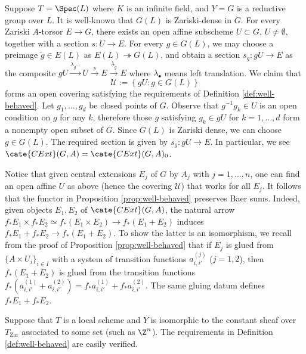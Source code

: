 \documentclass[a4paper,10pt]{article}
\begin{document}
\begin{example}\label{eg:well-behaved-reductive}
	Suppose $T = \Spec(L)$ where $K$ is an infinite field, and $Y = G$ is a reductive group over $L$. It is well-known that $G(L)$ is Zariski-dense in $G$. For every Zariski $A$-torsor $E \to G$, there exists an open affine subscheme $U \subset G$, $U \neq \emptyset$, together with a section $s: U \to E$. For every $g \in G(L)$, we may choose a preimage $\tilde{g} \in E(L)$ as $E(L) \twoheadrightarrow G(L)$, and obtain a section $s_g: gU \to E$ as the composite $gU \xrightarrow{\lambda_{g^{-1}}} U \xrightarrow{s} E \xrightarrow{\lambda_{\tilde{g}}} E$ where $\lambda_\bullet$ means left translation. We claim that
	\[ \mathcal{U} := \left\{ gU: g \in G(L) \right\} \]
	forms an open covering satisfying the requirements of Definition \ref{def:well-behaved}. Let $g_1, \ldots, g_d$ be closed points of $G$. Observe that $g^{-1}g_k \in U$ is an open condition on $g$ for any $k$, therefore those $g$ satisfying $g_k \in gU$ for $k=1, \ldots, d$ form a nonempty open subset of $G$. Since $G(L)$ is Zariski dense, we can choose $g \in G(L)$. The required section is given by $s_g: gU \to E$. In particular, we see $\cate{CExt}(G,A) = \cate{CExt}(G,A)_0$.
	
	Notice that given central extensions $E_j$ of $G$ by $A_j$ with $j=1,\ldots,n$, one can find an open affine $U$ as above (hence the covering $\mathcal{U}$) that works for all $E_j$. It follows that the functor in Proposition \ref{prop:well-behaved} preserves Baer sums. Indeed, given objects $E_1, E_2$ of $\cate{CExt}(G, A)$, the natural arrow $f_* E_1 \times f_* E_2 \simeq f_*(E_1 \times E_2) \to f_*(E_1 + E_2)$ induces $f_* E_1 + f_* E_2 \to f_*(E_1 + E_2)$. To show the latter is an isomorphism, we recall from the proof of Proposition \ref{prop:well-behaved} that if $E_j$ is glued from $\{ A \times U_i\}_{i \in I}$ with a system of transition functions $a^{(j)}_{i,i'}$ ($j=1,2$), then $f_* (E_1 + E_2)$ is glued from the transition functions $f_*(a^{(1)}_{i,i'} + a^{(2)}_{i,i'}) = f_* a^{(1)}_{i,i'} + f_* a^{(2)}_{i,i'}$. The same gluing datum defines $f_* E_1 + f_* E_2$.
\end{example}

\begin{example}
	Suppose that $T$ is a local scheme and $Y$ is isomorphic to the constant sheaf over $T_\text{Zar}$ associated to some set (such as $\Z^n$). The requirements in Definition \ref{def:well-behaved} are easily verified.
\end{example}
\end{document}
